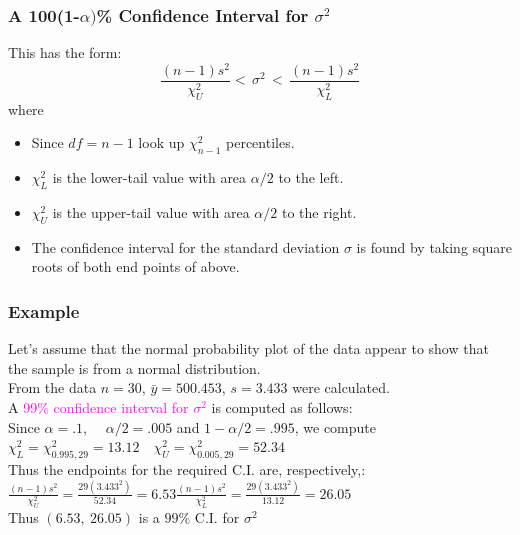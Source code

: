 \documentclass[xcolor=dvipsnames,12pt]{beamer}
\begin{document}
\begin{frame}
\frametitle{A 100(1-{\boldmath$\alpha)$}\% Confidence Interval for {\boldmath$\sigma^2$}}
 This has the form:
$$
  \frac{(n-1)s^2}{\chi_U^2} < \, \sigma^2 \, < \, \frac{(n-1)s^2}{\chi_L^2}
$$
 where \\[.01in]
 \begin{itemize}
\item Since $df = n-1$ look up $\chi_{n-1}^2$ percentiles.\\[.01in]
\item $\chi_L^2$ is the lower-tail value  with area $\alpha/2$ to the left. \\[.01in]
\item  $\chi_U^2$ is the upper-tail value with area $\alpha/2$ to the right.\\[.01in] 
\item The confidence interval for the standard deviation  $\sigma$ is found by taking square roots of both end points of above.
\end{itemize}
\end{frame}




\begin{frame}
\frametitle{Example}
Let's assume that the normal probability plot of the data  appear 
to show that the sample is from a normal distribution.\\[.1in]
From the data $n = 30$, $\bar{y} = 500.453$, $s= 3.433$ were calculated.\\[.1in]
A \textcolor{magenta}{99\% confidence interval for $\sigma^2$} is computed as follows:\\[.1in]
 Since $\alpha=.1$, \ \ $\alpha/2=.005$ and $1-\alpha/2=.995$, we compute \\[.1in]
 $\chi_L^2 =\chi_{0.995,29}^2 = 13.12 \quad \chi_U^2 = \chi_{0.005,29}^2 = 52.34$\\[.1in]
 Thus the endpoints for the required C.I. are, respectively,:\\[.1in]
\hspace*{.3in}$\frac{(n-1)s^2}{\chi_U^2} = \frac{29(3.433^2)}{52.34} = 6.53$\qquad$\frac{(n-1)s^2}{\chi_L^2} = \frac{29(3.433^2)}{13.12} = 26.05$\\[.2in]
\hspace*{.6in} Thus $(6.53,\ 26.05 )$ is a $99\%$ C.I. for $\sigma^2$
\end{frame}
\end{document}
